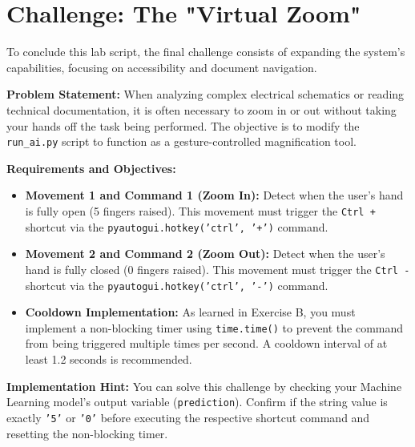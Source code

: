 \section{Challenge: The "Virtual Zoom"}

To conclude this lab script, the final challenge consists of expanding the system's capabilities, focusing on accessibility and document navigation.

\vspace{0.4cm}
\textbf{Problem Statement:} 
When analyzing complex electrical schematics or reading technical documentation, it is often necessary to zoom in or out without taking your hands off the task being performed. The objective is to modify the \texttt{run\_ai.py} script to function as a gesture-controlled magnification tool.

\vspace{0.6cm}
\textbf{Requirements and Objectives:}
\begin{itemize}
    \item \textbf{Movement 1 and Command 1 (Zoom In):} Detect when the user's hand is fully open (5 fingers raised). This movement must trigger the \texttt{Ctrl +} shortcut via the \texttt{pyautogui.hotkey('ctrl', '+')} command.
    \item \textbf{Movement 2 and Command 2 (Zoom Out):} Detect when the user's hand is fully closed (0 fingers raised). This movement must trigger the \texttt{Ctrl -} shortcut via the \texttt{pyautogui.hotkey('ctrl', '-')} command.
    \item \textbf{Cooldown Implementation:} As learned in Exercise B, you must implement a non-blocking timer using \texttt{time.time()} to prevent the command from being triggered multiple times per second. A cooldown interval of at least 1.2 seconds is recommended.
\end{itemize}

\vspace{0.4cm}
\textbf{Implementation Hint:} You can solve this challenge by checking your Machine Learning model's output variable (\texttt{prediction}). Confirm if the string value is exactly \texttt{'5'} or \texttt{'0'} before executing the respective shortcut command and resetting the non-blocking timer.